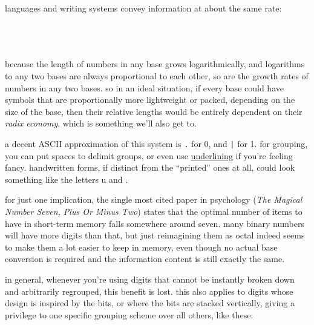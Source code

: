 \documentclass[../footnotes.tex]{subfiles}
\begin{document}

\myfootnote{} languages and writing systems convey information at about the same rate: \\
 \\
 \\
 \\

\myfootnote{} because the length of numbers in any base grows logarithmically, and logarithms to any two bases are always proportional to each other, so are the growth rates of numbers in any two bases. so in an ideal situation, if every base could have symbols that are proportionally more lightweight or packed, depending on the size of the base, then their relative lengths would be entirely dependent on their {\it radix economy}, which is something we'll also get to.

\myfootnote{} a decent ASCII approximation of this system is \verb#.# for 0, and \verb#|# for 1. for grouping, you can put spaces to delimit groups, or even use \underline{underlining} if you're feeling fancy. handwritten forms, if distinct from the ``printed'' ones at all, could look something like the letters u and \textturnm.

\myfootnote{} for just one implication, the single most cited paper in psychology ({\it The Magical Number Seven, Plus Or Minus Two}) states that the optimal number of items to have in short-term memory falls somewhere around seven. many binary numbers will have more digits than that, but just reimagining them as octal indeed seems to make them a lot easier to keep in memory, even though no actual base conversion is required and the information content is still exactly the same.

\myfootnote{} in general, whenever you're using digits that cannot be instantly broken down and arbitrarily regrouped, this benefit is lost. this also applies to digits whose design is inspired by the bits, or where the bits are stacked vertically, giving a privilege to one specific grouping scheme over all others, like these: \\
 \\
\end{document}
